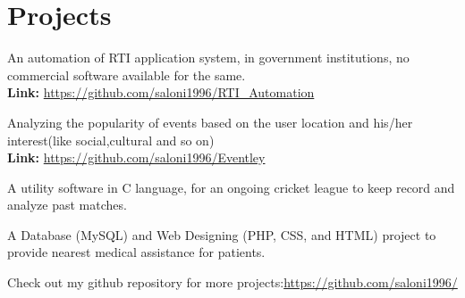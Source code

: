 \documentclass[]{hieudo-build}
\begin{document}
\begin{minipage}[t]{0.69\textwidth} 

\section{Projects}

\descript{}
An automation of RTI application system, in government institutions, no commercial software available for the same. \\
\textbf{Link:} \url{https://github.com/saloni1996/RTI_Automation}
\sectionsep

\descript{}
Analyzing the popularity of events based on the user location and his/her interest(like social,cultural and so on)\\
\textbf{Link:} \url{https://github.com/saloni1996/Eventley}
\sectionsep

\descript{}
A utility software in C language, for an ongoing cricket league to keep record and analyze past matches.
\sectionsep 

\descript{}
A Database (MySQL) and Web Designing (PHP, CSS, and HTML) project to provide nearest medical assistance for patients.
\sectionsep

\descript{}
Check out my github repository for more projects:\url{https://github.com/saloni1996/}
\sectionsep

\end{minipage} 
\end{document}
